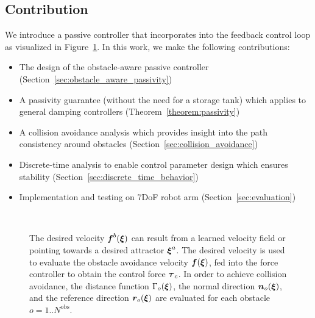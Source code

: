 \subsection{Contribution}
We introduce a passive controller that incorporates into the feedback control loop as visualized in Figure~\ref{fig:control_scheme_passive}. 
In this work, we make the following contributions:
\begin{itemize}
\item The design of the obstacle-aware passive controller
(Section~\ref{sec:obstacle_aware_passivity})
\item A passivity guarantee (without the need for a storage tank) which applies to general damping controllers (Theorem~\ref{theorem:passivity})
\item A collision avoidance analysis which provides insight into the path consistency around obstacles (Section~\ref{sec:collision_avoidance})
\item Discrete-time analysis to enable control parameter design which ensures stability (Section~\ref{sec:discrete_time_behavior})
\item Implementation and testing on 7DoF robot arm (Section~\ref{sec:evaluation})
\end{itemize}

\ifthesis
\,
\else
\begin{figure}[thb]
  \center
  
\caption{The desired velocity $\boldsymbol{f}^b(\boldsymbol{\xi})$ can result from a learned velocity field or pointing towards a desired attractor $\boldsymbol{\xi}^a$. The desired velocity is used to evaluate the obstacle avoidance velocity $\boldsymbol{f}(\boldsymbol{\xi})$, fed into the force controller to obtain the control force $\boldsymbol{\tau}_c$. In order to achieve collision avoidance, the distance function $\Gamma_o(\boldsymbol{\xi})$, the normal direction $\boldsymbol{n}_o(\boldsymbol{\xi})$, and the reference direction $\boldsymbol{r}_o(\boldsymbol{\xi})$ are evaluated for each obstacle $o = 1 .. N^\mathrm{{obs}}$.}
\label{fig:control_scheme_passive}
\end{figure}
\fi
